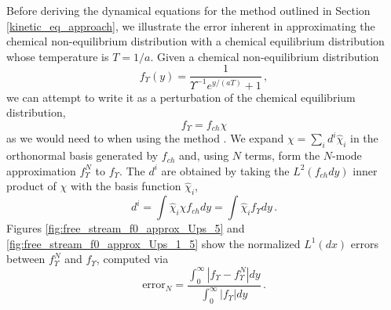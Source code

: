 \label{basis_comparison}
Before deriving the dynamical equations for the method outlined in Section \ref{kinetic_eq_approach}, we illustrate the error inherent in approximating the chemical non-equilibrium distribution   with a  chemical equilibrium distribution  whose temperature is $T=1/a$.   Given a chemical non-equilibrium distribution 
\begin{equation}\label{zeroth_approx}
f_\Upsilon (y)=\frac{1}{\Upsilon^{-1}e^{y/(aT)}+1}\,,
\end{equation}
 we can attempt to write it as a perturbation of the chemical equilibrium distribution,  
\begin{equation}\label{chi_def}
f_\Upsilon=f_{ch}\chi
\end{equation} as we would need to when using the method .  We expand $\chi=\sum_i d^i\hat\chi_i$ in the orthonormal basis generated by $f_{ch}$ and, using $N$ terms, form the $N$-mode approximation $f_\Upsilon^N$ to $f_\Upsilon$.  The $d^i$ are obtained by taking the $L^2(f_{ch}dy)$ inner product of $\chi$ with the basis function $\hat\chi_i$,
\begin{equation}
d^i=\int\hat\chi_i \chi f_{ch}dy=\int\hat\chi_i  f_\Upsilon dy\,.
\end{equation}
 Figures \ref{fig:free_stream_f0_approx_Ups_5} and \ref{fig:free_stream_f0_approx_Ups_1_5} show the normalized $L^1(dx)$ errors between $f_\Upsilon^N$ and $f_\Upsilon$, computed via
\begin{equation}
\text{error}_N=\frac{\int_0^\infty |f_\Upsilon -f_\Upsilon ^N|dy}{\int_0^\infty |f_\Upsilon |dy}\,.
\end{equation}
